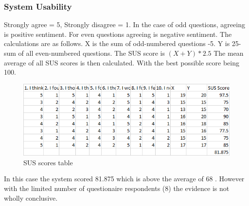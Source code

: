       \subsubsection{System Usability}
      Strongly agree = 5, Strongly disagree = 1. In the case of odd questions, agreeing is positive sentiment. For even questions agreeing is negative sentiment. The calculations are as follows. X is the sum of odd-numbered questions -5. Y is 25-sum of all even-numbered questions. The SUS score is $ (X+Y)*2.5 $ The mean average of all SUS scores is then calculated. With the best possible score being 100.
      \begin{figure}[H]
        \begin{center}
          \includegraphics[scale=0.7]{Images/susScoresTable}
          \caption{SUS scores table}
          \label{fig:sus_scores_table}
        \end{center}
      \end{figure}
      In this case the system scored 81.875 which is above the average of 68 \citep{Sauro2011}. However with the limited number of questionaire respondents (8) the evidence is not wholly conclusive.

